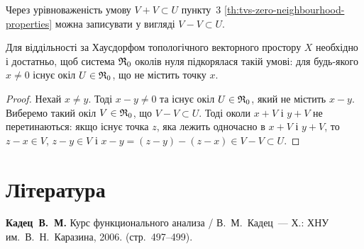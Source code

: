 \begin{remark}
    Через урівноваженість умову $V + V \subset U$ пункту~3 \cref{th:tvs-zero-neighbourhood-properties} можна записувати у вигляді $V - V \subset U$.
\end{remark}

\begin{theorem}
    Для віддільності за Хаусдорфом топологічного векторного простору $X$ необхідно і достатньо, щоб система $\frak R_0$ околів нуля підкорялася такій умові: для будь-якого $x \ne 0$ існує окіл $U \in \frak R_0$, що не містить точку $x$.
\end{theorem}

\begin{proof}
    Нехай $x \ne y$. Тоді $x - y \ne 0$ та існує окіл $U \in \frak R_0$, який не містить $x - y$. Виберемо такий окіл $V \in \frak R_0$, що $V - V \subset U$. Тоді околи $x + V$ і $y + V$ не перетинаються: якщо існує точка $z$, яка лежить одночасно в $x + V$ і $y + V$, то $z - x \in V$, $z - y \in V$ і $x - y = (z - y) - (z - x) \in V - V \subset U$.
\end{proof}

\section{Література}

\begin{enumerate}[label={[\arabic*]}]
\item \textbf{Кадец~В.~М.}
Курс функционального анализа /
В.~М.~Кадец~---
Х.: ХНУ им.~В.~Н.~Каразина, 2006. (стр.~497--499).
\end{enumerate}
